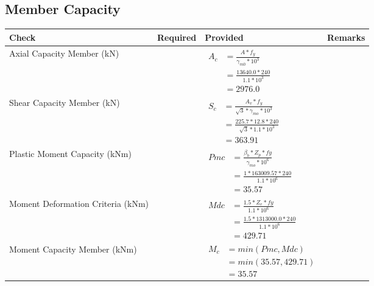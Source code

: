 \documentclass{article}%
\begin{document}
\subsection{Member Capacity}%
\label{subsec:MemberCapacity}%
\renewcommand{\arraystretch}{1.2}%
\begin{longtable}{|p{4cm}|p{5cm}|p{5.5cm}|p{1.5cm}|}%
\hline%
\rowcolor{OsdagGreen}%
Check&Required&Provided&Remarks\\%
\hline%
\endhead%
\hline%
Axial Capacity Member (kN)&&$\begin{aligned} A_c &=\frac{A*f_y}{\gamma_{m0} *10^3}\\ &=\frac{13640.0*240}{1.1* 10^3}\\ &=2976.0\end{aligned}$&\\%
\hline%
Shear Capacity Member (kN)&&$\begin{aligned} S_c &= \frac{A_v*f_y}{\sqrt{3}*\gamma_{mo} *10^3}\\ &=\frac{225.7*12.8*240}{\sqrt{3}*1.1 *10^3}\\ &=363.91\end{aligned}$&\\%
\hline%
Plastic Moment Capacity (kNm)&&$\begin{aligned} Pmc &= \frac{\beta_b * Z_p *fy}{\gamma_{mo} * 10^6}\\ &=\frac{1*163009.57*240}{1.1 * 10^6}\\ &=35.57\end{aligned}$&\\%
\hline%
Moment Deformation Criteria (kNm)&&$\begin{aligned} Mdc &= \frac{1.5 *Z_e *fy}{1.1* 10^6}\\ &= \frac{1.5 *1313000.0*240}{1.1* 10^6}\\ &= 429.71\end{aligned}$&\\%
\hline%
Moment Capacity Member (kNm)&&$\begin{aligned} M_c &= min(Pmc,Mdc)\\ &=min(35.57,429.71)\\ &=35.57\end{aligned}$&\\%
\hline%
\end{longtable}

%
\newpage%
\end{document}
